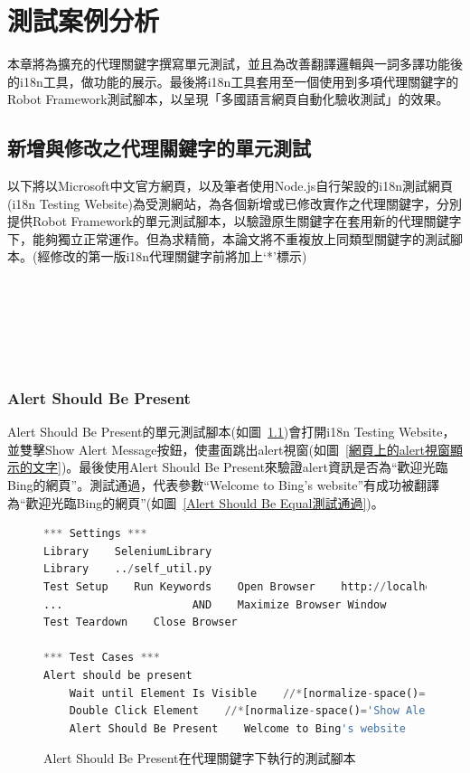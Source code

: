 \chapter{測試案例分析}
本章將為擴充的代理關鍵字撰寫單元測試\cite{ut}，並且為改善翻譯邏輯與一詞多譯功能後的i18n工具，做功能的展示。最後將i18n工具套用至一個使用到多項代理關鍵字的Robot Framework測試腳本，以呈現「多國語言網頁自動化驗收測試」的效果。

\section{新增與修改之代理關鍵字的單元測試}
以下將以Microsoft中文官方網頁\cite{microsoft}，以及筆者使用Node.js\cite{nodejs}自行架設的i18n測試網頁(i18n Testing Website)為受測網站，為各個新增或已修改實作之代理關鍵字，分別提供Robot Framework的單元測試腳本，以驗證原生關鍵字在套用新的代理關鍵字下，能夠獨立正常運作。但為求精簡，本論文將不重複放上同類型關鍵字的測試腳本。(經修改的第一版i18n代理關鍵字前將加上‘*’標示)

\hspace*{\fill} \\
\\ \hspace*{\fill} \\
\\ \hspace*{\fill} \\
\subsection{Alert Should Be Present}
Alert Should Be Present的單元測試腳本(如圖~\ref{Alert Should Be Present在代理關鍵字下執行的測試腳本})會打開i18n Testing Website，並雙擊Show Alert Message按鈕，使畫面跳出alert視窗(如圖~\ref{網頁上的alert視窗顯示的文字})。最後使用Alert Should Be Present來驗證alert資訊是否為“歡迎光臨Bing的網頁”。測試通過，代表參數“Welcome to Bing’s website”有成功被翻譯為“歡迎光臨Bing的網頁”(如圖~\ref{Alert Should Be Equal測試通過})。

\begin{figure}[H]
\begin{lstlisting}[language={python}]
*** Settings ***
Library    SeleniumLibrary
Library    ../self_util.py
Test Setup    Run Keywords    Open Browser    http://localhost:3000    Chrome
...                    AND    Maximize Browser Window
Test Teardown    Close Browser

*** Test Cases ***
Alert should be present
    Wait until Element Is Visible    //*[normalize-space()='Show Alert Message']    timeout=${shortPeriodOfTime}
    Double Click Element    //*[normalize-space()='Show Alert Message']
    Alert Should Be Present    Welcome to Bing's website
\end{lstlisting}
\caption{Alert Should Be Present在代理關鍵字下執行的測試腳本}
\label{Alert Should Be Present在代理關鍵字下執行的測試腳本}
\end{figure}


